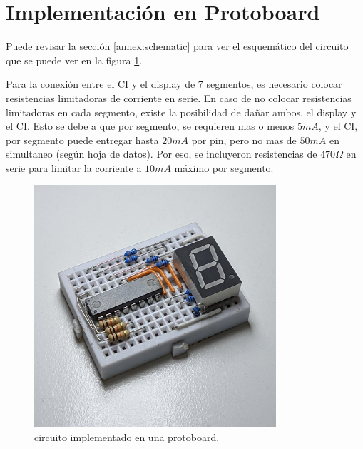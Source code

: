   \section{Implementación en Protoboard}
    Puede revisar la sección \ref{annex:schematic} para ver el esquemático del circuito que se puede ver en la figura
    \ref{fig:proto-cd4511}.

    Para la conexión entre el CI y el display de 7 segmentos, es necesario colocar resistencias
    limitadoras de corriente en serie. En caso de no colocar resistencias limitadoras en cada segmento, existe la
    posibilidad de dañar ambos, el display y el CI. Esto se debe a que por segmento, se requieren mas o menos $5mA$, y el
    CI, por segmento puede entregar hasta $20mA$ por pin, pero no mas de $50mA$ en simultaneo (según hoja de datos).
    Por eso, se incluyeron resistencias de $470\Omega$ en serie para limitar la corriente a $10mA$ máximo por segmento.

    \begin{figure}[!ht]
      \centering
      \includegraphics[width=0.8\textwidth]{pictures/cd4511-proto.jpg}
      \caption{circuito implementado en una protoboard.}
      \label{fig:proto-cd4511}
    \end{figure}
